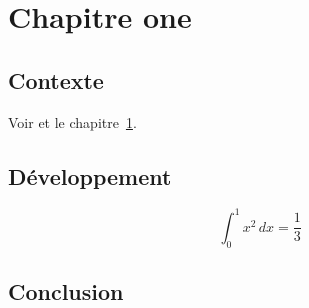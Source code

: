 \chapter{Chapitre one}\label{chap:one}
\section{Contexte}
\lipsum[1-16]
Voir \cite{knuth1984} et le chapitre~\ref{chap:one}.
\section{Développement}
\lipsum[17-32]
\begin{equation}
  \int_0^1 x^2 \, dx = \frac{1}{3}
\end{equation}
\section{Conclusion}
\lipsum[33-48]
